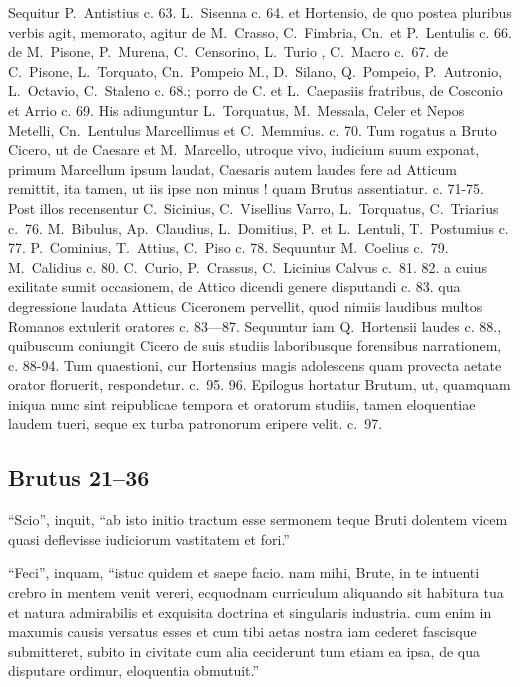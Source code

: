 Sequitur P.~Antistius c. 63. L.~Sisenna c. 64. et Hortensio, de quo postea pluribus verbis agit, memorato, agitur de M.~Crasso, C.~Fimbria, Cn.~et P.~Lentulis c. 66. de M.~Pisone, P.~Murena, C.~Censorino, L.~Turio , C.~Macro c.~67. de C.~Pisone, L.~Torquato, Cn.~Pompeio M., D.~Silano, Q.~Pompeio, P.~Autronio, L.~Octavio, C.~Staleno c. 68.; porro de C. et L.~Caepasiis fratribus, de Cosconio et Arrio c. 69. His adiunguntur L.~Torquatus, M.~Messala, Celer et Nepos Metelli, Cn.~Lentulus Marcellimus et C.~Memmius. c. 70. Tum rogatus a Bruto Cicero, ut de Caesare et M.~Marcello, utroque vivo, iudicium suum exponat, primum Marcellum ipsum laudat, Caesaris autem laudes fere ad Atticum remittit, ita tamen, ut iis ipse non minus ! quam Brutus assentiatur. c. 71-75. Post illos recensentur C.~Sicinius, C.~Visellius Varro, L.~Torquatus, C.~Triarius c.~76. M.~Bibulus, Ap.~Claudius, L.~Domitius, P.~et L.~Lentuli, T.~Postumius c. 77. P.~Cominius, T.~Attius, C.~Piso c. 78. Sequuntur M.~Coelius c.\ 79. M.~Calidius c. 80. C.~Curio, P.~Crassus, C.~Licinius Calvus c.\ 81. 82. a cuius exilitate sumit occasionem, de Attico dicendi genere disputandi c. 83. qua degressione laudata Atticus Ciceronem pervellit, quod nimiis laudibus multos Romanos extulerit oratores c. 83—87. Sequuntur iam Q.~Hortensii laudes c. 88., quibuscum coniungit Cicero de suis studiis laboribusque forensibus narrationem, c. 88-94. Tum quaestioni, cur Hortensius magis adolescens quam provecta aetate orator floruerit, respondetur. c.\ 95. 96. Epilogus hortatur Brutum, ut, quamquam iniqua nunc sint reipublicae tempora et oratorum studiis, tamen eloquentiae laudem tueri, seque ex turba patronorum eripere velit. c.\ 97.

\subsection*{Brutus 21–36}

``Scio'', inquit, ``ab isto initio tractum esse sermonem teque Bruti dolentem vicem quasi deflevisse iudiciorum vastitatem et fori.''

``Feci'', inquam, ``istuc quidem et saepe facio. nam mihi, Brute, in te intuenti crebro in mentem venit vereri, ecquodnam curriculum aliquando sit habitura tua et natura admirabilis et exquisita doctrina et singularis industria. cum enim in maxumis causis versatus esses et cum tibi aetas nostra iam cederet fascisque submitteret, subito in civitate cum alia ceciderunt tum etiam ea ipsa, de qua disputare ordimur, eloquentia obmutuit.''

